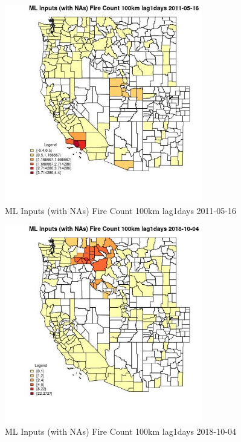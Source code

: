 \begin{figure} 
\centering  
\includegraphics[width=0.77\textwidth]{Code_Outputs/Report_ML_input_PM25_Step4_part_f_de_duplicated_aves_prioritize_24hr_obswNAs_CountyFire_Count_100km_lag1daysMean2011-05-16.jpg} 
\caption{\label{fig:Report_ML_input_PM25_Step4_part_f_de_duplicated_aves_prioritize_24hr_obswNAsCountyFire_Count_100km_lag1daysMean2011-05-16}ML Inputs (with NAs) Fire Count 100km lag1days 2011-05-16} 
\end{figure} 
 

\clearpage 

\begin{figure} 
\centering  
\includegraphics[width=0.77\textwidth]{Code_Outputs/Report_ML_input_PM25_Step4_part_f_de_duplicated_aves_prioritize_24hr_obswNAs_CountyFire_Count_100km_lag1daysMean2018-10-04.jpg} 
\caption{\label{fig:Report_ML_input_PM25_Step4_part_f_de_duplicated_aves_prioritize_24hr_obswNAsCountyFire_Count_100km_lag1daysMean2018-10-04}ML Inputs (with NAs) Fire Count 100km lag1days 2018-10-04} 
\end{figure} 
 


